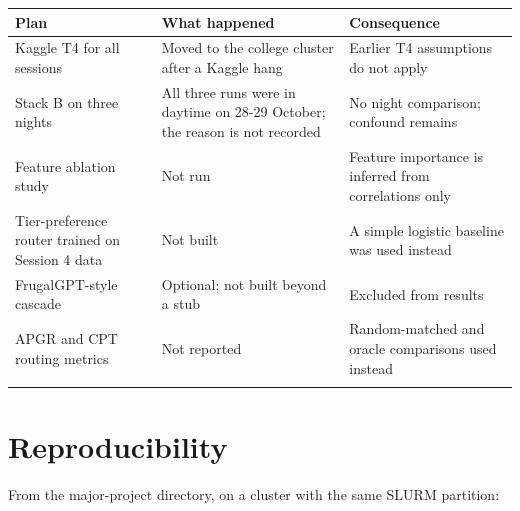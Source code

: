 \begingroup\footnotesize\setlength{\tabcolsep}{4pt}
\begin{longtable}{>{\raggedright\arraybackslash}p{49.3mm}>{\raggedright\arraybackslash}p{40.2mm}>{\raggedright\arraybackslash}p{52.1mm}}
\toprule
\textbf{Plan} & \textbf{What happened} & \textbf{Consequence} \\
\midrule
\endhead
Kaggle T4 for all sessions & Moved to the college cluster after a Kaggle hang & Earlier T4 assumptions do not apply \\*
Stack B on three nights & All three runs were in daytime on 28-29 October; the reason is not recorded & No night comparison; confound remains \\*
Feature ablation study & Not run & Feature importance is inferred from correlations only \\*
Tier-preference router trained on Session 4 data & Not built & A simple logistic baseline was used instead \\*
FrugalGPT-style cascade & Optional; not built beyond a stub & Excluded from results \\*
APGR and CPT routing metrics & Not reported & Random-matched and oracle comparisons used instead \\*
\bottomrule\noalign{\nobreak}
\end{longtable}
\addtocounter{table}{-1}
\endgroup

\section{Reproducibility}
From the major-project directory, on a cluster with the same SLURM partition:

